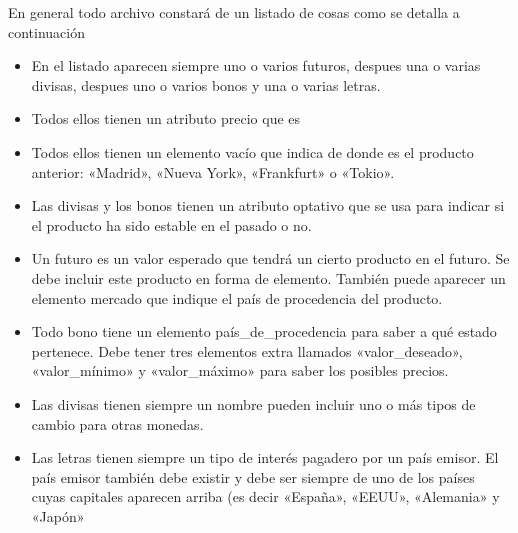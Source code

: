 \documentclass[letterpaper,10pt,spanish]{sphinxmanual}
\begin{document}
En general todo archivo constará de un listado de cosas como se detalla a continuación
\begin{itemize}
\item {} 
En el listado aparecen siempre uno o varios futuros, despues una o varias divisas, despues uno o varios bonos y una o varias letras.

\item {} 
Todos ellos tienen un atributo precio que es 

\item {} 
Todos ellos tienen un elemento vacío que indica  de donde es el producto anterior: «Madrid», «Nueva York», «Frankfurt» o «Tokio».

\item {} 
Las divisas y los bonos tienen un atributo optativo que se usa para indicar si el producto ha sido estable en el pasado o no.

\item {} 
Un futuro es un valor esperado que tendrá un cierto producto en el futuro. Se debe incluir este producto en forma de elemento. También puede aparecer un elemento mercado que indique el país de procedencia del producto.

\item {} 
Todo bono tiene un elemento país\_de\_procedencia para saber a qué estado pertenece. Debe tener tres elementos extra llamados «valor\_deseado», «valor\_mínimo» y «valor\_máximo» para saber los posibles precios.

\item {} 
Las divisas tienen siempre un nombre pueden incluir uno o más tipos de cambio para otras monedas.

\item {} 
Las letras tienen siempre un tipo de interés pagadero por un país emisor. El país emisor también debe existir y debe ser siempre de uno de los países cuyas capitales aparecen arriba (es decir «España», «EEUU», «Alemania» y «Japón»

\end{itemize}
\end{document}
